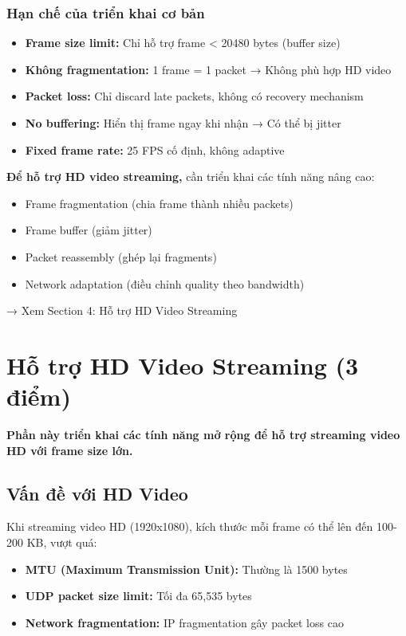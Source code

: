 \documentclass[a4paper,12pt]{article}
\begin{document}
\subsubsection{Hạn chế của triển khai cơ bản}

\begin{itemize}
    \item \textbf{Frame size limit:} Chỉ hỗ trợ frame < 20480 bytes (buffer size)
    \item \textbf{Không fragmentation:} 1 frame = 1 packet → Không phù hợp HD video
    \item \textbf{Packet loss:} Chỉ discard late packets, không có recovery mechanism
    \item \textbf{No buffering:} Hiển thị frame ngay khi nhận → Có thể bị jitter
    \item \textbf{Fixed frame rate:} 25 FPS cố định, không adaptive
\end{itemize}

\textbf{Để hỗ trợ HD video streaming,} cần triển khai các tính năng nâng cao:
\begin{itemize}
    \item Frame fragmentation (chia frame thành nhiều packets)
    \item Frame buffer (giảm jitter)
    \item Packet reassembly (ghép lại fragments)
    \item Network adaptation (điều chỉnh quality theo bandwidth)
\end{itemize}

→ Xem Section 4: Hỗ trợ HD Video Streaming

\clearpage

\section{Hỗ trợ HD Video Streaming (3 điểm)}

\textbf{Phần này triển khai các tính năng mở rộng để hỗ trợ streaming video HD với frame size lớn.}

\subsection{Vấn đề với HD Video}

Khi streaming video HD (1920x1080), kích thước mỗi frame có thể lên đến 100-200 KB, vượt quá:
\begin{itemize}
    \item \textbf{MTU (Maximum Transmission Unit):} Thường là 1500 bytes
    \item \textbf{UDP packet size limit:} Tối đa 65,535 bytes
    \item \textbf{Network fragmentation:} IP fragmentation gây packet loss cao
\end{itemize}
\end{document}
